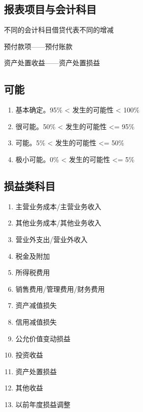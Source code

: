 \documentclass[UTF8,12pt]{ctexart}
\numberwithin{equation}{section} %
\numberwithin{figure}{section}
\numberwithin{table}{section}
\begin{document}
	\subsection{报表项目与会计科目}
	不同的会计科目借贷代表不同的增减
	
	预付款项——预付账款
	
	资产处置收益——资产处置损益
	
	\subsection{可能}
	\begin{enumerate}
		\item 基本确定。95\% < 发生的可能性 < 100\%
		
		\item 很可能。50\% < 发生的可能性 <= 95\%
		
		\item 可能。5\% < 发生的可能性 <= 50\%
		
		\item 极小可能。0\% < 发生的可能性 <= 5\%
	\end{enumerate}
	
	\subsection{损益类科目}
	\begin{enumerate}
		\item 主营业务成本/主营业务收入
		
		\item 其他业务成本/其他业务收入
		
		\item 营业外支出/营业外收入
		
		\item 税金及附加
		
		\item 所得税费用
		
		\item 销售费用/管理费用/财务费用
		
		\item 资产减值损失
		
		\item 信用减值损失
		
		\item 公允价值变动损益
		
		\item 投资收益
		
		\item 资产处置损益
		
		\item 其他收益
		
		\item 以前年度损益调整
	\end{enumerate}
	
\end{document}
